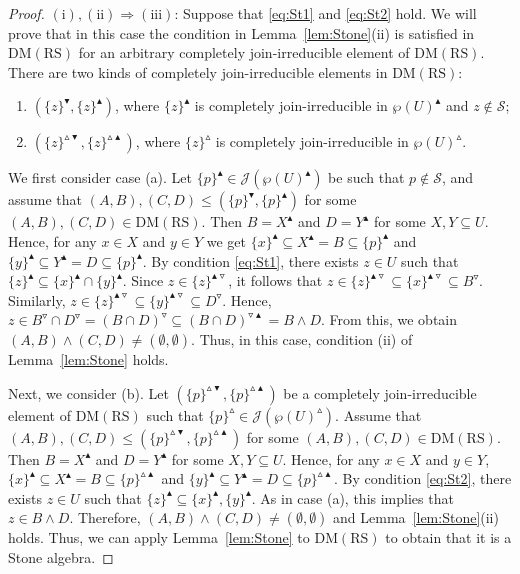 \documentclass[11pt,a4paper]{amsart}
\newcommand{\UP}{\blacktriangle}
\newcommand{\DOWN}{\blacktriangledown}
\newcommand{\Up}{\vartriangle}
\newcommand{\Down}{\triangledown}
\theoremstyle{plain}
\theoremstyle{definition}
\theoremstyle{remark}
\numberwithin{equation}{section}
\begin{document}
\begin{proof}
\smallskip\noindent%
$\mathrm{(i),(ii)}\Rightarrow\mathrm{(iii)}$: 
Suppose that \eqref{eq:St1} and \eqref{eq:St2} hold.
We will prove that in this case the condition in 
Lemma~\ref{lem:Stone}(ii) is satisfied
in $\mathrm{DM(RS)}$ for an arbitrary completely join-irreducible element of $\mathrm{DM(RS)}$. There are two kinds of completely 
join-irreducible elements in $\mathrm{DM(RS)}$:
\begin{enumerate}
\item[(a)] $(\{z\}^\DOWN,\{z\}^\UP)$, where
$\{z\}^\UP$ is completely join-irreducible in 
$\wp(U)^{\UP}$ and $z\notin\mathcal{S}$;

\item[(b)] $(\{z\}^{\Up\DOWN},\{z\}^{\Up\UP})$, 
where $\{z\}^{\Up}$ is completely join-irreducible in
$\wp(U)^{\Up}$.
\end{enumerate}

We first consider case (a). 
Let $\{p\}^{\UP}\in\mathcal{J}(\wp(U)^{\UP})$ be such that $p\notin\mathcal{S}$, and assume that
$(A,B),(C,D)\leq(\{p\}^\DOWN,\{p\}^{\UP})$ for some
$(A,B),(C,D)\in\mathrm{DM(RS)}$. Then $B = X^{\UP}$ and
$D = Y^{\UP}$ for some $X,Y\subseteq U$. Hence, for any $x\in X$ and
$y\in Y$ we get $\{x\}^{\UP}\subseteq X^{\UP}
=B\subseteq\{p\}^{\UP}$ and $\{y\}^{\UP}\subseteq
Y^{\UP}= D\subseteq\{p\}^{\UP}$. By condition \eqref{eq:St1},
there exists $z\in U$ such that $\{z\}^{\UP}\subseteq
\{x\}^{\UP} \cap \{y\}^{\UP}$. 
Since $z \in \{z\}^{\UP\Down}$, it follows that
$z \in \{z\}^{\UP\Down} \subseteq \{x\}^{\UP\Down} \subseteq B^\Down$. Similarly,
$z \in \{z\}^{\UP\Down} \subseteq \{y\}^{\UP\Down} \subseteq D^\Down$.
Hence, $z \in B^{\Down}\cap D^{\Down} = 
(B\cap D)^\Down \subseteq (B\cap D)^{\Down\UP}
= B\wedge D$. From this, we obtain  
$(A,B)\wedge (C,D) \neq (\emptyset,\emptyset)$. 
Thus, in this case, condition (ii) of
Lemma~\ref{lem:Stone} holds.

Next, we consider (b). Let $(\{p\}^{\Up\DOWN},\{p\}^{\Up\UP})$ be a 
completely join-irreducible element of $\mathrm{DM(RS)}$ such
that $\{p\}^\Up\in\mathcal{J}(\wp(U)^\Up)$. Assume that 
$(A,B),(C,D)\leq(\{p\}^{\Up\DOWN},\{p\}^{\Up\UP})$
for some $(A,B),(C,D)\in\mathrm{DM(RS)}$.
Then $B = X^{\UP}$ and $D = Y^{\UP}$ for some $X,Y\subseteq U$. 
Hence, for any $x\in X$ and $y\in Y$,  
$\{x\}^\UP \subseteq X^\UP = B\subseteq\{p\}^{\Up\UP}$ and
$\{y\}^\UP \subseteq Y^\UP = D \subseteq \{p\}^{\Up\UP}$. 
By condition \eqref{eq:St2}, there exists $z\in U$ such that
$\{z\}^\UP \subseteq \{x\}^\UP,\{y\}^\UP$. 
As in case (a), this implies that 
$z \in B\wedge D$. Therefore, 
$(A,B)\wedge (C,D) \neq (\emptyset,\emptyset)$ and Lemma~\ref{lem:Stone}(ii) holds. 
Thus, we can apply Lemma~\ref{lem:Stone} to $\mathrm{DM(RS)}$
to obtain that it is a Stone algebra.


\end{proof}
\end{document}
